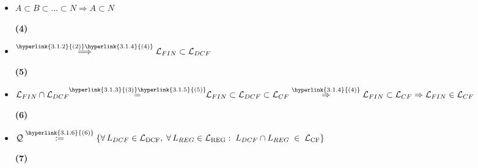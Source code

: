 \begin{tcolorbox}[colback=yellow!15!white, colframe=blue!50!white,
	fonttitle=\bfseries\Large, title = Απόδειξη]
\begin{itemize}
	\item $A \subset B \subset...\subset N \Rightarrow A \subset N$
	\reducevspace\reducevspace\reducevspace\reducevspace\reducevspace\reducevspace
	\reducevspace\reducevspace\reducevspace\reducevspace\reducevspace\reducevspace
	\reducevspace\reducevspace\reducevspace\reducevspace\reducevspace\reducevspace
	\reducevspace\reducevspace\reducevspace\reducevspace\reducevspace\reducevspace
	\begin{flushright}\hypertarget{3.1.4}{\bf{(4)}}\end{flushright}

	\item $\overset{\hyperlink{3.1.2}{(2)} \hyperlink{3.1.4}{(4)}}{\Longrightarrow} \mathcal{L}_{FIN} \subset
	\mathcal{L}_{DCF}$
	\reducevspace\reducevspace\reducevspace\reducevspace\reducevspace\reducevspace
	\reducevspace\reducevspace\reducevspace\reducevspace\reducevspace\reducevspace
	\reducevspace\reducevspace\reducevspace\reducevspace\reducevspace\reducevspace
	\reducevspace\reducevspace\reducevspace\reducevspace\reducevspace\reducevspace
	\begin{flushright}\hypertarget{3.1.5}{\bf{(5)}}\end{flushright}

	\item $\mathcal{L}_{FIN} \cap \mathcal{L}_{DCF}\!\!\overset{\hyperlink{3.1.3}{(3)}\hyperlink{3.1.5}{(5)}}{=}\!\!
	\mathcal{L}_{FIN} \subset \mathcal{L}_{DCF} \subset \mathcal{L}_{CF}
	\overset{\hyperlink{3.1.4}{(4)}}{\Rightarrow} \mathcal{L}_{FIN} \subset \mathcal{L}_{CF} \Rightarrow
	\mathcal{L}_{FIN} \in \mathcal{L}_{CF}$
	\reducevspace\reducevspace\reducevspace\reducevspace\reducevspace\reducevspace
	\reducevspace\reducevspace\reducevspace\reducevspace\reducevspace\reducevspace
	\reducevspace\reducevspace\reducevspace\reducevspace\reducevspace\reducevspace
	\reducevspace\reducevspace\reducevspace\reducevspace\reducevspace\reducevspace
	\begin{flushright}\hypertarget{3.1.6}{\bf{(6)}}\end{flushright}

	\item $\mathcal{Q} \overset{\hyperlink{3.1.6}{(6)}}{:=} \{\forall\,L_{DCF}\in\mathcal
	L_{\mathrm{DCF}},\;\forall\,L_{REG}\in\mathcal
	L_{\mathrm{REG}}:\;L_{DCF}\cap L_{REG}\;\in\;\mathcal L_{\mathrm{CF}}\}$
	\reducevspace\reducevspace\reducevspace\reducevspace\reducevspace\reducevspace
	\reducevspace\reducevspace\reducevspace\reducevspace\reducevspace\reducevspace
	\reducevspace\reducevspace\reducevspace\reducevspace\reducevspace\reducevspace
	\reducevspace\reducevspace\reducevspace\reducevspace\reducevspace\reducevspace
	\begin{flushright}\hypertarget{3.1.7}{\bf{(7)}}\end{flushright}


\end{itemize}
\end{tcolorbox}
